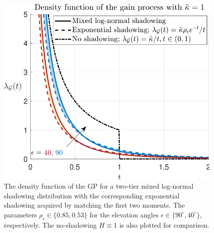 \documentclass[lettersize,journal]{IEEEtran}
\begin{document}
         \begin{figure}[h]
           \centering
           \includegraphics[width=\linewidth]{plotdensities.pdf}
           \caption{The density function of the GP for a two-tier mixed log-normal shadowing distribution with the corresponding exponential shadowing acquired by matching the first two moments. The parameters $\rho_{\epsilon} \in \{0.85,0.53\}$ for the elevation angles $\epsilon \in \{90^{\circ},40^{\circ}\}$, respectively. The no-shadowing $H\equiv 1$ is also plotted for comparison.} 
           \label{fig:plotdensities}
         \end{figure}

\end{document}

